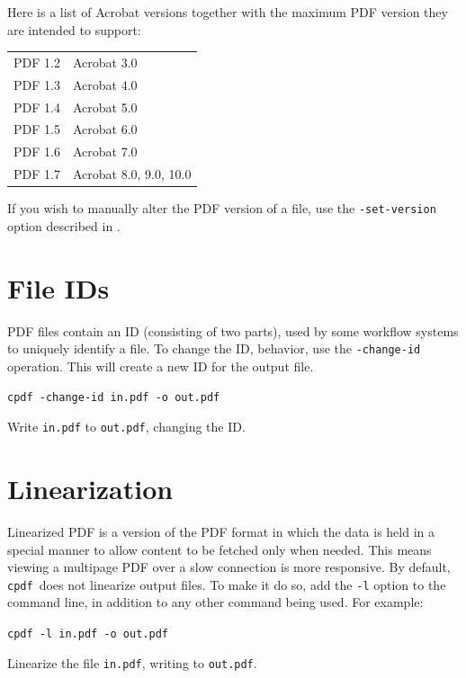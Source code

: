 \documentclass[a4paper,makeidx]{memoir}
\newcommand{\cpdf}{\texttt{cpdf}}
\begin{document}
Here is a list of Acrobat versions together with the maximum PDF version they
are intended to support:

\vspace{2mm}
  \begin{tabular}{rl}
     PDF 1.2 & Acrobat 3.0 \\
     PDF 1.3 & Acrobat 4.0 \\
     PDF 1.4 & Acrobat 5.0 \\
     PDF 1.5 & Acrobat 6.0 \\
     PDF 1.6 & Acrobat 7.0 \\
     PDF 1.7 & Acrobat 8.0, 9.0, 10.0
  \end{tabular}
\vspace{2mm}

\noindent If you wish to manually alter the PDF version of a file, use the
\texttt{-set-version} option described in .

\section{File IDs}
PDF files contain an ID (consisting of two parts), used by some workflow
systems to uniquely identify a file. To change the ID, behavior, use the
\texttt{-change-id} operation. This will create a new ID for the output file. 

\begin{framed}
\small\verb!cpdf -change-id in.pdf -o out.pdf!

\vspace{2.5mm}
\noindent Write \texttt{in.pdf} to \texttt{out.pdf}, changing the ID.
\end{framed}

\section{Linearization}
Linearized PDF is a version of the PDF format in which the data is held in a
special manner to allow content to be fetched only when needed. This means
viewing a multipage PDF over a slow connection is more responsive. By default,
\cpdf\ does not linearize output files. To make it do so, add the \texttt{-l}
option to the command line, in addition to any other command being used. For example:

\begin{framed}
\small\verb!cpdf -l in.pdf -o out.pdf!

\vspace{2.5mm}
\noindent Linearize the file \texttt{in.pdf}, writing to \texttt{out.pdf}.
\end{framed}
\end{document}
